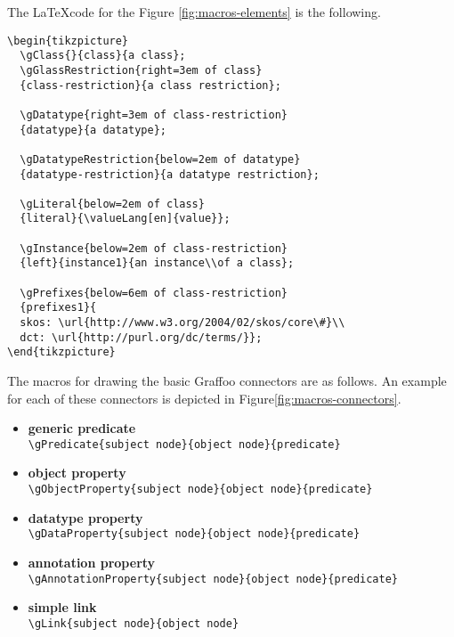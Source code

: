 The \LaTeX code for the Figure \ref{fig:macros-elements} is the following.

\begin{verbatim}
\begin{tikzpicture}
  \gClass{}{class}{a class};
  \gGlassRestriction{right=3em of class}
  {class-restriction}{a class restriction};
  
  \gDatatype{right=3em of class-restriction}
  {datatype}{a datatype};
  
  \gDatatypeRestriction{below=2em of datatype}
  {datatype-restriction}{a datatype restriction};
  
  \gLiteral{below=2em of class}
  {literal}{\valueLang[en]{value}};
  
  \gInstance{below=2em of class-restriction}
  {left}{instance1}{an instance\\of a class};	
  
  \gPrefixes{below=6em of class-restriction}
  {prefixes1}{
  skos: \url{http://www.w3.org/2004/02/skos/core\#}\\
  dct: \url{http://purl.org/dc/terms/}};
\end{tikzpicture}
\end{verbatim}


The macros for drawing the basic Graffoo connectors are as follows. An example for each of these connectors is depicted in Figure\ref{fig:macros-connectors}.
	
\begin{itemize}
	\item \textbf{generic predicate}\\ \verb|\gPredicate{subject node}{object node}{predicate}|
	
	\item \textbf{object property}\\ \verb|\gObjectProperty{subject node}{object node}{predicate}|
	
	\item \textbf{datatype property}\\ \verb|\gDataProperty{subject node}{object node}{predicate}|
	
	
	\item \textbf{annotation property}\\ \verb|\gAnnotationProperty{subject node}{object node}{predicate}|
	
	\item \textbf{simple link}\\ \verb|\gLink{subject node}{object node}|
\end{itemize}


